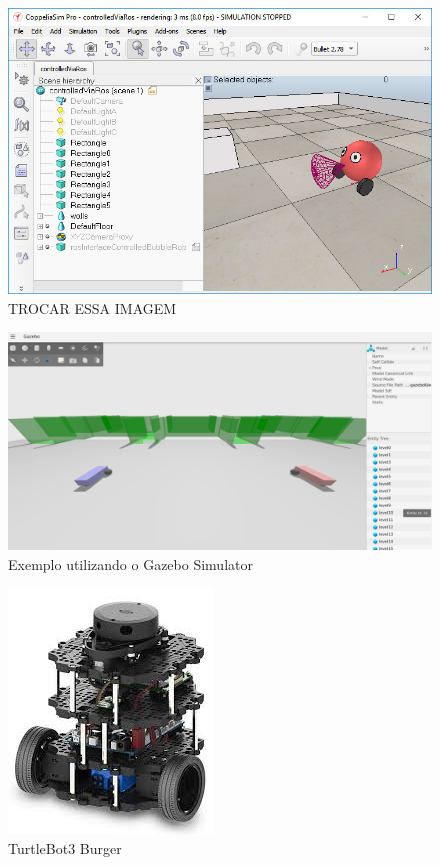 \begin{figure}[htb]
    \centering
    \includegraphics[width=0.5\linewidth]{Figures/ROS.png}
    \caption{TROCAR ESSA IMAGEM \cite{cop2020}}
    \label{fig:ROS25}
\end{figure}

\newpage
\begin{figure}[htb]
    \centering
    \includegraphics[width=0.5\linewidth]{Figures/gazebo.png}
    \caption{Exemplo utilizando o Gazebo Simulator \cite{gzb2025}}
    \label{fig:gzb25}
\end{figure}

\begin{figure}[htb]
    \centering
    \includegraphics[width=0.3\linewidth]{Figures/TurtleBot3.jpg}
    \caption{TurtleBot3 Burger \cite{tbt2025}}
    \label{fig:tbt3b25}
\end{figure}